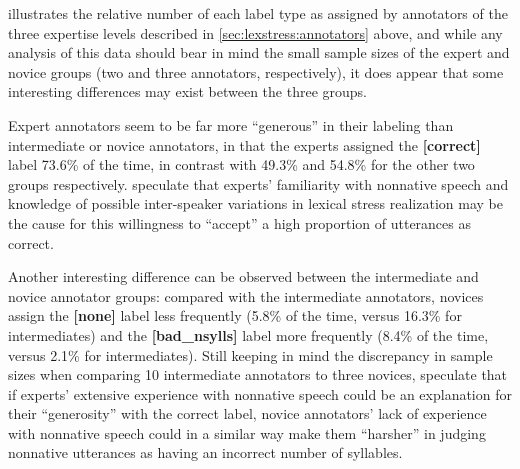 			 illustrates the relative number of each label type as assigned by annotators of the three expertise levels described in \cref{sec:lexstress:annotators} above, and while any analysis of this data should bear in mind the small sample sizes of the expert and novice groups (two and three annotators, respectively), it does appear that some interesting differences may exist between the three groups. 
			
			Expert annotators seem to be far more ``generous'' in their labeling than intermediate or novice annotators, in that the experts assigned the \textbf{[correct]} label 73.6\% of the time, in contrast with 49.3\% and 54.8\% for the other two groups respectively.  speculate that experts' familiarity with nonnative speech and knowledge of possible inter-speaker variations in lexical stress realization may be the cause for this willingness to ``accept'' a high proportion of utterances as correct. 
			
			Another interesting difference can be observed between the intermediate and novice annotator groups: compared with the intermediate annotators, novices assign the \textbf{[none]} label less frequently (5.8\% of the time, versus 16.3\% for intermediates) and the \textbf{[bad\_nsylls]} label more frequently (8.4\% of the time, versus 2.1\% for intermediates). Still keeping in mind the discrepancy in sample sizes when comparing 10 intermediate annotators to three novices,  speculate that if experts' extensive experience with nonnative speech could be an explanation for their ``generosity'' with the correct label, novice annotators' lack of experience with nonnative speech could in a similar way make them ``harsher'' in judging nonnative utterances as having an incorrect number of syllables. 
			
			
